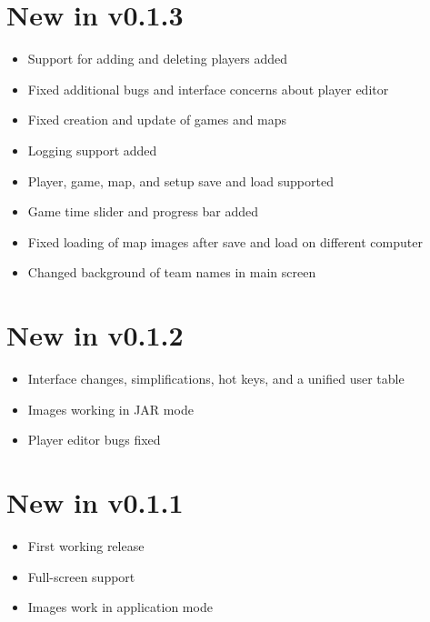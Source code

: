 \documentclass[10pt,a4paper]{report}
\begin{document}
\section{New in v0.1.3}
\begin{itemize}
\item Support for adding and deleting players added
\item Fixed additional bugs and interface concerns about player editor
\item Fixed creation and update of games and maps
\item Logging support added
\item Player, game, map, and setup save and load supported
\item Game time slider and progress bar added
\item Fixed loading of map images after save and load on different computer
\item Changed background of team names in main screen
\end{itemize}
\section{New in v0.1.2}
\begin{itemize}
\item Interface changes, simplifications, hot keys, and a unified user table
\item Images working in JAR mode
\item Player editor bugs fixed
\end{itemize}
\section{New in v0.1.1}
\begin{itemize}
\item First working release
\item Full-screen support
\item Images work in application mode
\end{itemize}
\end{document}
